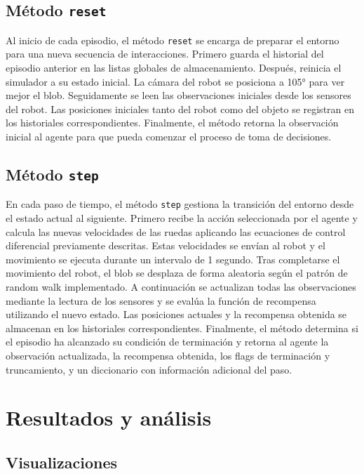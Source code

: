 \documentclass[12pt,a4paper]{article}
\begin{document}
\subsection{Método \texttt{reset}}

Al inicio de cada episodio, el método \texttt{reset} se encarga de preparar el
entorno para una nueva secuencia de interacciones. Primero guarda el historial
del episodio anterior en las listas globales de almacenamiento. Después,
reinicia el simulador a su estado inicial. La
cámara del robot se posiciona a 105° para ver mejor el
blob. Seguidamente se leen las observaciones iniciales desde los sensores del
robot. Las posiciones iniciales tanto del robot como del objeto se registran en
los historiales correspondientes. Finalmente, el método retorna la observación
inicial al agente para que pueda comenzar el proceso de toma de decisiones.

\subsection{Método \texttt{step}}

En cada paso de tiempo, el método \texttt{step} gestiona la transición del
entorno desde el estado actual al siguiente. Primero recibe la acción
seleccionada por el agente y calcula las nuevas velocidades de las ruedas
aplicando las ecuaciones de control diferencial previamente descritas. Estas
velocidades se envían al robot y el movimiento se ejecuta durante un intervalo
de 1 segundo. Tras completarse el movimiento del robot, el blob se desplaza de
forma aleatoria según el patrón de random walk implementado. A continuación se
actualizan todas las observaciones mediante la lectura de los sensores y se
evalúa la función de recompensa utilizando el nuevo estado. Las posiciones
actuales y la recompensa obtenida se almacenan en los historiales
correspondientes. Finalmente, el método determina si el episodio ha alcanzado su
condición de terminación y retorna al agente la observación actualizada, la
recompensa obtenida, los flags de terminación y truncamiento, y un diccionario
con información adicional del paso.

\section{Resultados y análisis}

\subsection{Visualizaciones}
\end{document}
